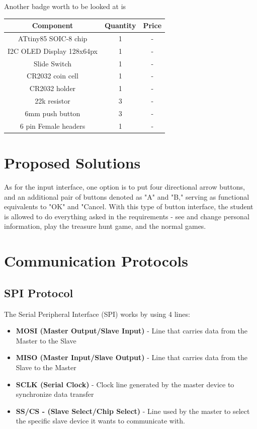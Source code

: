 \documentclass[english]{ist-thesis}
\begin{document}
Another badge worth to be looked at is 

\begin{center}
\begin{tabular}{ |c|c|c| } 
 \hline
 Component & Quantity & Price \\ 
 \hline
 ATtiny85 SOIC-8 chip & 1 & - \\ 
 \hline
 I2C OLED Display 128x64px & 1 & - \\ 
 \hline
 Slide Switch & 1 & - \\ 
 \hline
 CR2032 coin cell & 1 & - \\ 
 \hline
 CR2032 holder & 1 & - \\ 
 \hline
 22k resistor & 3 & - \\ 
 \hline
 6mm push button & 3 & - \\ 
 \hline
 6 pin Female headers & 1 & - \\ 
 \hline
\end{tabular}
\end{center}

\section{Proposed Solutions}

As for the input interface, one option is to put four directional arrow buttons, and an additional pair of buttons denoted as "A" and "B," serving as functional equivalents to "OK" and "Cancel. With this type of button interface, the student is allowed to do everything asked in the requirements - see and change personal information, play the treasure hunt game, and the normal games. 

\section{Communication Protocols}

\subsection{SPI Protocol}

The Serial Peripheral Interface (SPI) works by using 4 lines:

\begin{itemize}
  \item \textbf{MOSI (Master Output/Slave Input)} - Line that carries data from the Master to the Slave
  \item \textbf{MISO (Master Input/Slave Output)} - Line that carries data from the Slave to the Master
  \item \textbf{SCLK (Serial Clock)} - Clock line generated by the master device to synchronize data transfer
  \item \textbf{SS/CS - (Slave Select/Chip Select)} - Line used by the master to select the specific slave device it wants to communicate with.
\end{itemize}
\end{document}
